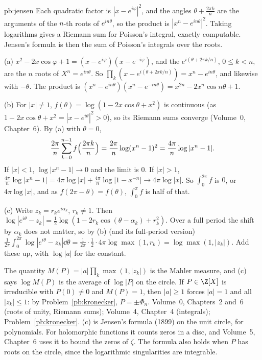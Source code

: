 \begin{solution}{pb:jensen}
\idea Each quadratic factor is $|x-e^{i\varphi}|^2$, and the angles $\theta+\frac{2\pi k}n$ are the arguments of the $n$-th
roots of $e^{in\theta}$, so the product is $|x^n-e^{in\theta}|^2$. Taking logarithms gives a Riemann sum for Poisson's
integral, exactly computable. Jensen's formula is then the sum of Poisson's integrals over the roots.

\writeup (a) $x^2-2x\cos\varphi+1=(x-e^{i\varphi})(x-e^{-i\varphi})$, and the $e^{i(\theta+2\pi k/n)}$, $0\le k<n$, are the $n$
roots of $X^n=e^{in\theta}$. So $\prod_k(x-e^{i(\theta+2\pi k/n)})=x^n-e^{in\theta}$, and likewise with $-\theta$. The product
is $(x^n-e^{in\theta})(x^n-e^{-in\theta})=x^{2n}-2x^n\cos n\theta+1$.

(b) For $|x|\ne1$, $f(\theta)=\log(1-2x\cos\theta+x^2)$ is continuous (as $1-2x\cos\theta+x^2=|x-e^{i\theta}|^2>0$), so its
Riemann sums converge (Volume~0, Chapter~6). By (a) with $\theta=0$,
\[
\frac{2\pi}n\sum_{k=0}^{n-1}f\Bigl(\frac{2\pi k}n\Bigr)=\frac{2\pi}n\log(x^n-1)^2=\frac{4\pi}n\log|x^n-1|.
\]
If $|x|<1$, $\log|x^n-1|\to0$ and the limit is $0$. If $|x|>1$, $\frac{4\pi}n\log|x^n-1|=4\pi\log|x|+\frac{4\pi}n\log|1-x^{-n}|\to
4\pi\log|x|$. So $\int_0^{2\pi}f$ is $0$, or $4\pi\log|x|$, and as $f(2\pi-\theta)=f(\theta)$, $\int_0^\pi f$ is half of that.

(c) Write $z_k=r_ke^{i\alpha_k}$, $r_k\ne1$. Then $\log|e^{i\theta}-z_k|=\frac12\log(1-2r_k\cos(\theta-\alpha_k)+r_k^2)$. Over a
full period the shift by $\alpha_k$ does not matter, so by (b) (and its full-period version)
$\frac1{2\pi}\int_0^{2\pi}\log|e^{i\theta}-z_k|\dd\theta=\frac1{2\pi}\cdot\frac12\cdot4\pi\log\max(1,r_k)=\log\max(1,|z_k|)$. Add
these up, with $\log|a|$ for the constant.

The quantity $M(P)=|a|\prod_k\max(1,|z_k|)$ is the Mahler measure, and (c) says $\log M(P)$ is the average of
$\log|P|$ on the circle. If $P\in\Z[X]$ is irreducible with $P(0)\ne0$ and $M(P)=1$, then $|a|\ge1$ forces $|a|=1$ and all
$|z_k|\le1$: by Problem~\ref{pb:kronecker}, $P=\pm\Phi_n$.
\tools Volume~0, Chapters~2 and~6 (roots of unity, Riemann sums); Volume~4, Chapter~4 (integrals); Problem~\ref{pb:kronecker}.
\leads (c) is Jensen's formula (1899) on the unit circle, for polynomials. For holomorphic functions it counts zeros in a
disc, and Volume~5, Chapter~6 uses it to bound the zeros of $\zeta$. The formula also holds when $P$ has roots on the circle,
since the logarithmic singularities are integrable.
\end{solution}


